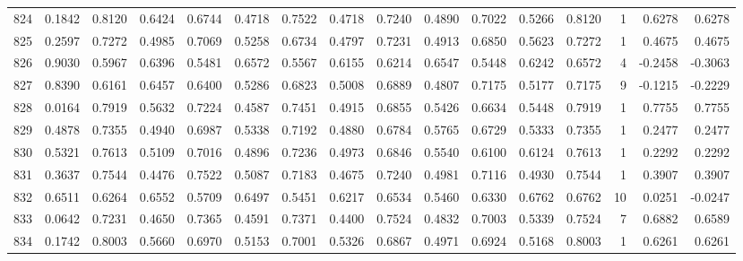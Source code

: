 \begin{tabular}{lrrrrrrrrrrrrrrr}
824 &      0.1842 &  0.8120 &  0.6424 &  0.6744 &  0.4718 &  0.7522 &  0.4718 &  0.7240 &  0.4890 &  0.7022 &   0.5266 &     0.8120 &      1 &                    0.6278 &                     0.6278 \\
825 &      0.2597 &  0.7272 &  0.4985 &  0.7069 &  0.5258 &  0.6734 &  0.4797 &  0.7231 &  0.4913 &  0.6850 &   0.5623 &     0.7272 &      1 &                    0.4675 &                     0.4675 \\
826 &      0.9030 &  0.5967 &  0.6396 &  0.5481 &  0.6572 &  0.5567 &  0.6155 &  0.6214 &  0.6547 &  0.5448 &   0.6242 &     0.6572 &      4 &                   -0.2458 &                    -0.3063 \\
827 &      0.8390 &  0.6161 &  0.6457 &  0.6400 &  0.5286 &  0.6823 &  0.5008 &  0.6889 &  0.4807 &  0.7175 &   0.5177 &     0.7175 &      9 &                   -0.1215 &                    -0.2229 \\
828 &      0.0164 &  0.7919 &  0.5632 &  0.7224 &  0.4587 &  0.7451 &  0.4915 &  0.6855 &  0.5426 &  0.6634 &   0.5448 &     0.7919 &      1 &                    0.7755 &                     0.7755 \\
829 &      0.4878 &  0.7355 &  0.4940 &  0.6987 &  0.5338 &  0.7192 &  0.4880 &  0.6784 &  0.5765 &  0.6729 &   0.5333 &     0.7355 &      1 &                    0.2477 &                     0.2477 \\
830 &      0.5321 &  0.7613 &  0.5109 &  0.7016 &  0.4896 &  0.7236 &  0.4973 &  0.6846 &  0.5540 &  0.6100 &   0.6124 &     0.7613 &      1 &                    0.2292 &                     0.2292 \\
831 &      0.3637 &  0.7544 &  0.4476 &  0.7522 &  0.5087 &  0.7183 &  0.4675 &  0.7240 &  0.4981 &  0.7116 &   0.4930 &     0.7544 &      1 &                    0.3907 &                     0.3907 \\
832 &      0.6511 &  0.6264 &  0.6552 &  0.5709 &  0.6497 &  0.5451 &  0.6217 &  0.6534 &  0.5460 &  0.6330 &   0.6762 &     0.6762 &     10 &                    0.0251 &                    -0.0247 \\
833 &      0.0642 &  0.7231 &  0.4650 &  0.7365 &  0.4591 &  0.7371 &  0.4400 &  0.7524 &  0.4832 &  0.7003 &   0.5339 &     0.7524 &      7 &                    0.6882 &                     0.6589 \\
834 &      0.1742 &  0.8003 &  0.5660 &  0.6970 &  0.5153 &  0.7001 &  0.5326 &  0.6867 &  0.4971 &  0.6924 &   0.5168 &     0.8003 &      1 &                    0.6261 &                     0.6261 \\

\end{tabular}

